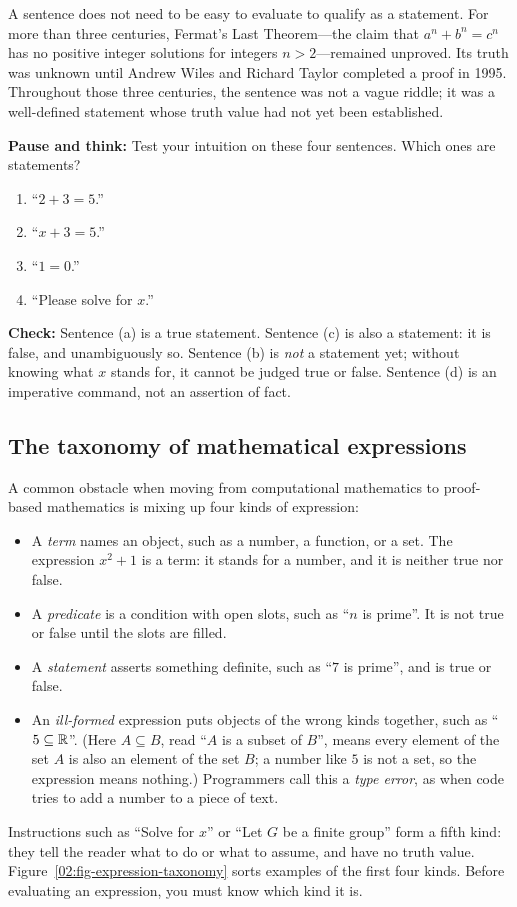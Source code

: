 A sentence does not need to be easy to evaluate to qualify as a statement. For more than three centuries, Fermat's Last Theorem---the claim that $a^n + b^n = c^n$ has no positive integer solutions for integers $n > 2$---remained unproved. Its truth was unknown until Andrew Wiles and Richard Taylor completed a proof in 1995. Throughout those three centuries, the sentence was not a vague riddle; it was a well-defined statement whose truth value had not yet been established.

\begin{recoverybox}
\textbf{Pause and think:} Test your intuition on these four sentences. Which ones are statements?
\begin{enumerate}[label=(\alph*)]
\item ``$2 + 3 = 5$.''
\item ``$x + 3 = 5$.''
\item ``$1 = 0$.''
\item ``Please solve for $x$.''
\end{enumerate}
\textbf{Check:} Sentence (a) is a true statement. Sentence (c) is also a statement: it is false, and unambiguously so. Sentence (b) is \emph{not} a statement yet; without knowing what $x$ stands for, it cannot be judged true or false. Sentence (d) is an imperative command, not an assertion of fact.
\end{recoverybox}

\subsection{The taxonomy of mathematical expressions}

A common obstacle when moving from computational mathematics to proof-based mathematics is mixing up four kinds of expression:
\begin{itemize}
\item A \emph{term} names an object, such as a number, a function, or a set. The expression $x^2 + 1$ is a term: it stands for a number, and it is neither true nor false.
\item A \emph{predicate} is a condition with open slots, such as ``$n$ is prime''. It is not true or false until the slots are filled.
\item A \emph{statement} asserts something definite, such as ``$7$ is prime'', and is true or false.
\item An \emph{ill-formed} expression puts objects of the wrong kinds together, such as ``$5 \subseteq \mathbb{R}$''. (Here $A \subseteq B$, read ``$A$ is a subset of $B$'', means every element of the set $A$ is also an element of the set $B$; a number like $5$ is not a set, so the expression means nothing.) Programmers call this a \emph{type error}, as when code tries to add a number to a piece of text.
\end{itemize}
Instructions such as ``Solve for $x$'' or ``Let $G$ be a finite group'' form a fifth kind: they tell the reader what to do or what to assume, and have no truth value. Figure~\ref{02:fig-expression-taxonomy} sorts examples of the first four kinds. Before evaluating an expression, you must know which kind it is.

